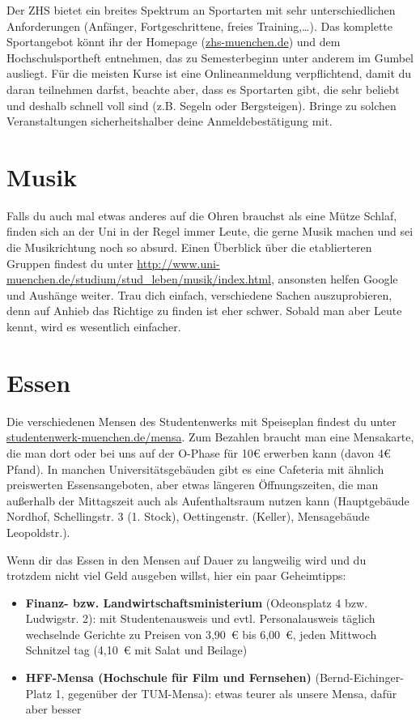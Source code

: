 Der ZHS bietet ein breites Spektrum an Sportarten mit sehr unterschiedlichen Anforderungen (Anfänger, Fortgeschrittene, freies Training,\ldots). Das komplette Sportangebot könnt ihr der Homepage (\url{zhs-muenchen.de}) und dem Hochschulsportheft entnehmen, das zu Semesterbeginn unter anderem im Gumbel ausliegt. Für die meisten Kurse ist eine Onlineanmeldung verpflichtend, damit du daran teilnehmen darfst, beachte aber, dass es Sportarten gibt, die sehr beliebt und deshalb schnell voll sind (z.B. Segeln oder Bergsteigen). Bringe zu solchen Veranstaltungen sicherheitshalber deine Anmeldebestätigung mit.


\section{Musik}
Falls du auch mal etwas anderes auf die Ohren brauchst als eine Mütze Schlaf, finden sich an der Uni in der Regel immer Leute, die gerne Musik machen und sei die Musikrichtung noch so absurd. Einen Überblick über die etablierteren Gruppen findest du unter \url{http://www.uni-muenchen.de/studium/stud_leben/musik/index.html}, ansonsten helfen Google und Aushänge weiter. Trau dich einfach, verschiedene Sachen auszuprobieren, denn auf Anhieb das Richtige zu finden ist eher schwer. Sobald man aber Leute kennt, wird es wesentlich einfacher.




\section{Essen}

Die verschiedenen Mensen des Studentenwerks mit Speiseplan findest du unter \url{studentenwerk-muenchen.de/mensa}. Zum Bezahlen braucht man eine Mensakarte, die man dort oder bei uns auf der O-Phase für 10€ erwerben kann (davon 4€ Pfand). In manchen Universitätsgebäuden gibt es eine Cafeteria mit ähnlich preiswerten Essensangeboten, aber etwas längeren Öffnungszeiten, die man außerhalb der Mittagszeit auch als Aufenthaltsraum nutzen kann (Hauptgebäude Nordhof, Schellingstr. 3 (1. Stock), Oettingenstr. (Keller), Mensagebäude Leopoldstr.).

Wenn dir das Essen in den Mensen auf Dauer zu langweilig wird und du trotzdem nicht viel Geld ausgeben willst, hier ein paar Geheimtipps:

\begin{itemize}
	\item \textbf{Finanz- bzw. Landwirtschaftsministerium} (Odeonsplatz 4 bzw. Ludwigstr. 2): mit Studentenausweis 		und evtl. Personalausweis täglich wechselnde Gerichte zu Preisen von 3,90~€ bis 6,00~€, jeden Mittwoch Schnitzel		tag (4,10~€ mit Salat und Beilage)
	
	\item \textbf{HFF-Mensa (Hochschule für Film und Fernsehen)}
          (Bernd-Eichinger-Platz 1, gegenüber der TUM-Mensa): etwas
          teurer als unsere Mensa, dafür aber besser
\end{itemize}
